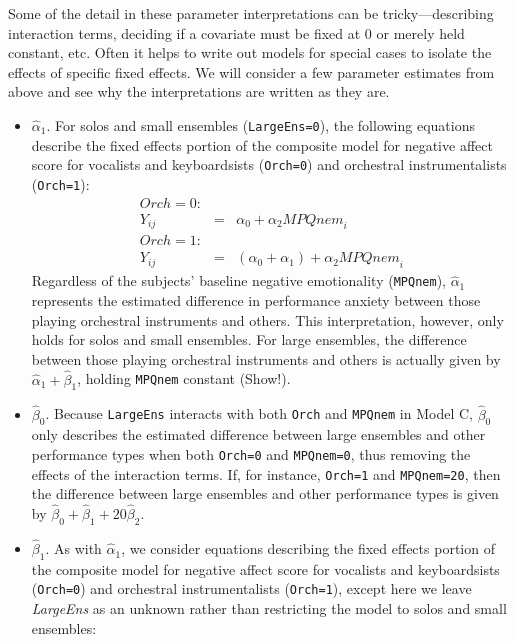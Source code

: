\documentclass[
]{krantz}
\begin{document}
Some of the detail in these parameter interpretations can be tricky---describing interaction terms, deciding if a covariate must be fixed at 0 or merely held constant, etc. Often it helps to write out models for special cases to isolate the effects of specific fixed effects. We will consider a few parameter estimates from above and see why the interpretations are written as they are.

\begin{itemize}
\item
  \(\hat{\alpha}_{1}\). For solos and small ensembles (\texttt{LargeEns=0}), the following equations describe the fixed effects portion of the composite model for negative affect score for vocalists and keyboardsists (\texttt{Orch=0}) and orchestral instrumentalists (\texttt{Orch=1}):
  \begin{eqnarray*}
  \textstyle{Orch}=0: & & \\
  Y_{ij} & = & \alpha_{0}+\alpha_{2}\textstyle{MPQnem}_{i} \\
  \textstyle{Orch}=1: & & \\
  Y_{ij} & = & (\alpha_{0}+\alpha_{1})+\alpha_{2}\textstyle{MPQnem}_{i}
  \end{eqnarray*}
  Regardless of the subjects' baseline negative emotionality (\texttt{MPQnem}), \(\hat{\alpha}_{1}\) represents the estimated difference in performance anxiety between those playing orchestral instruments and others. This interpretation, however, only holds for solos and small ensembles. For large ensembles, the difference between those playing orchestral instruments and others is actually given by \(\hat{\alpha}_{1}+\hat{\beta}_{1}\), holding \texttt{MPQnem} constant (Show!).
\item
  \(\hat{\beta}_{0}\). Because \texttt{LargeEns} interacts with both \texttt{Orch} and \texttt{MPQnem} in Model C, \(\hat{\beta}_{0}\) only describes the estimated difference between large ensembles and other performance types when both \texttt{Orch=0} and \texttt{MPQnem=0}, thus removing the effects of the interaction terms. If, for instance, \texttt{Orch=1} and \texttt{MPQnem=20}, then the difference between large ensembles and other performance types is given by \(\hat{\beta}_{0}+\hat{\beta}_{1}+20\hat{\beta}_{2}\).
\item
  \(\hat{\beta}_{1}\). As with \(\hat{\alpha}_{1}\), we consider equations describing the fixed effects portion of the composite model for negative affect score for vocalists and keyboardsists (\texttt{Orch=0}) and orchestral instrumentalists (\texttt{Orch=1}), except here we leave \emph{LargeEns} as an unknown rather than restricting the model to solos and small ensembles:

\end{itemize}
\end{document}
